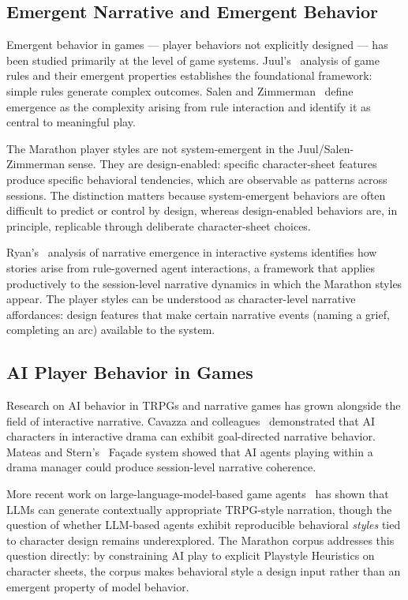 \subsection{Emergent Narrative and Emergent Behavior}

Emergent behavior in games --- player behaviors not explicitly designed --- has been
studied primarily at the level of game systems. Juul's~\cite{juul2005half} analysis
of game rules and their emergent properties establishes the foundational framework:
simple rules generate complex outcomes. Salen and Zimmerman~\cite{salen2004rules}
define emergence as the complexity arising from rule interaction and identify it as
central to meaningful play.

The Marathon player styles are not system-emergent in the Juul/Salen-Zimmerman sense.
They are design-enabled: specific character-sheet features produce specific behavioral
tendencies, which are observable as patterns across sessions. The distinction matters
because system-emergent behaviors are often difficult to predict or control by design,
whereas design-enabled behaviors are, in principle, replicable through deliberate
character-sheet choices.

Ryan's~\cite{ryan2006narrative} analysis of narrative emergence in interactive systems
identifies how stories arise from rule-governed agent interactions, a framework that
applies productively to the session-level narrative dynamics in which the Marathon
styles appear. The player styles can be understood as character-level narrative affordances:
design features that make certain narrative events (naming a grief, completing an arc)
available to the system.

\subsection{AI Player Behavior in Games}

Research on AI behavior in TRPGs and narrative games has grown alongside the field of
interactive narrative. Cavazza and colleagues~\cite{cavazza2002character} demonstrated
that AI characters in interactive drama can exhibit goal-directed narrative behavior.
Mateas and Stern's~\cite{mateas2003architecture} Fa\c{c}ade system showed that AI agents
playing within a drama manager could produce session-level narrative coherence.

More recent work on large-language-model-based game agents~\cite{akoury2023rik} has
shown that LLMs can generate contextually appropriate TRPG-style narration, though the
question of whether LLM-based agents exhibit reproducible behavioral \textit{styles}
tied to character design remains underexplored. The Marathon corpus addresses this
question directly: by constraining AI play to explicit Playstyle Heuristics on character
sheets, the corpus makes behavioral style a design input rather than an emergent
property of model behavior.

